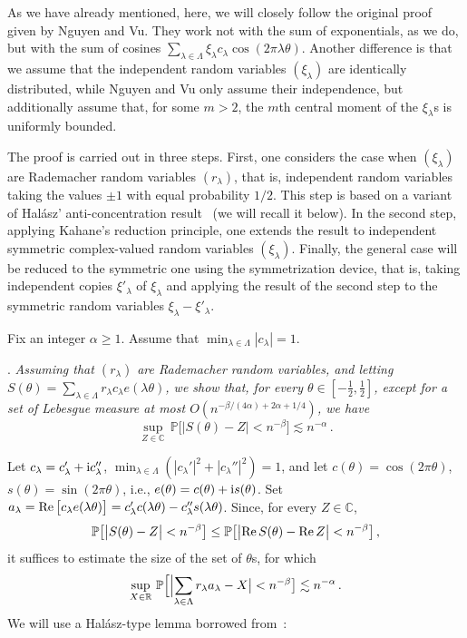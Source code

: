 \documentclass[11pt]{amsart}
\numberwithin{equation}{section}
\newcommand{\bR}{\mathbb R}
\newcommand{\bC}{\mathbb C}
\newcommand{\bP}{\mathbb P}
\begin{document}
As we have already mentioned, here, we will closely follow
the original proof given by Nguyen and Vu. They work not with the sum of
exponentials, as we do, but with the sum of cosines
$ \sum_{\lambda\in\Lambda} \xi_\lambda c_\lambda \cos(2\pi \lambda\theta)$.
Another difference is that we assume that the independent random variables $(\xi_\lambda)$
are identically distributed, while Nguyen and Vu only assume their independence, but
additionally assume that, for some $m>2$, the $m$th central moment of the $\xi_\lambda$s is uniformly bounded.

The proof is carried out in three steps. First, one considers the case
when $(\xi_\lambda)$ are Radema\-cher random variables $(r_\lambda)$, that is,
independent random variables taking the values
$\pm 1$ with equal probability $1/2$. This step is based on a variant of
Hal\'asz' anti-con\-cent\-ration result~\cite[Lemma~9.3]{NV} (we will recall it
below). In the second step, applying Kahane's reduction principle, one extends the result
to independent symmetric complex-valued random variables $(\xi_\lambda)$.
Finally, the general case will be reduced to the symmetric one using the symmetrization device, that is,
taking independent copies $\xi'_\lambda$ of $\xi_\lambda$ and applying the result of the second
step to the symmetric random variables $\xi_\lambda-\xi'_\lambda$.

\medskip 
Fix an integer $ \alpha \ge 1$. Assume that
$\min_{\lambda\in\Lambda} |c_\lambda| =1$.

\medskip{}.
{\em Assuming that $(r_\lambda)$ are Rademacher random variables, and letting
$S(\theta) = \sum_{\lambda\in\Lambda} r_\lambda c_\lambda e(\lambda\theta)$,
we show that, for every $\theta \in [-\tfrac12, \tfrac12]$, except for a set of Lebesgue measure
at most $O(n^{-\beta/(4\alpha) + 2\alpha + 1/4})$, we have}
$$ 
\sup_{Z\in\bC}\, \bP\bigl[\bigl| S(\theta) - Z\bigr| < n^{-\beta} \bigr] \lesssim n^{-\alpha}\,.
$$ 

Let $c_\lambda = c_\lambda' + {\rm i} c_\lambda''$, $\min_{\lambda\in\Lambda}
(|c_\lambda'|^2 +|c_\lambda''|^2) = 1$,
and let $c(\theta) = \cos(2\pi\theta)$, $s(\theta) = \sin (2\pi\theta)$, i.e.,
$e(\theta) = c(\theta) + {\rm i} s(\theta)$. Set $a_\lambda
= {\rm Re}\, \bigl[ c_\lambda e(\lambda\theta) \bigr] =
c_\lambda' c(\lambda\theta) -
c_{\lambda}'' s(\lambda\theta)$.
Since, for every $Z\in\bC$,
\[
\bP\bigl[\bigl| S(\theta) - Z \bigr| < n^{-\beta} \bigr]
\le
\bP\bigl[\bigl| {\rm Re\,} S(\theta) - {\rm Re\,} Z \bigr| < n^{-\beta} \bigr]\,,
\]
it suffices to estimate the size of the set of $\theta$s, for which
\begin{equation}\label{eq-NV2}
\sup_{X\in\bR}\, \bP\Bigl[\Bigl|
\sum_{\lambda\in\Lambda} r_\lambda a_\lambda  -  X \bigr| < n^{-\beta} \bigr]
\lesssim n^{-\alpha}\,.
\end{equation}
We will use a Hal\'asz-type lemma borrowed from~\cite[Lemma~9.3]{NV}:
\end{document}
